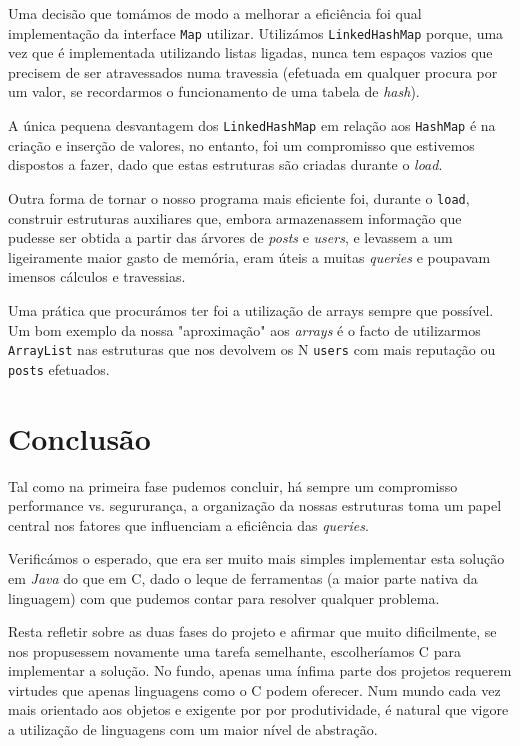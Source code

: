 \documentclass[10pt]{article}
\begin{document}
			Uma decisão que tomámos de modo a melhorar a eficiência
	foi qual implementação da interface \texttt{Map} utilizar.
	Utilizámos \texttt{LinkedHashMap} porque, uma vez que é 
	implementada utilizando listas ligadas, nunca tem espaços vazios 
	que precisem de ser atravessados numa travessia (efetuada 
	em qualquer procura por um valor, se recordarmos o funcionamento 
	de uma tabela de \textit{hash}). 
	
		A única pequena desvantagem dos
	\texttt{LinkedHashMap} em relação aos \texttt{HashMap} é na 
	criação e inserção de valores, no entanto, foi um compromisso que 
	estivemos dispostos a fazer, dado que estas estruturas são criadas 
	durante o \textit{load}.
	
		Outra forma de tornar o nosso programa mais eficiente foi, 
	durante o \texttt{load}, construir estruturas auxiliares que, 
	embora armazenassem informação que pudesse ser obtida a partir 
	das árvores de \textit{posts} e \textit{users}, e levassem a um 
	ligeiramente maior gasto de memória, eram úteis a muitas 
	\textit{queries} e poupavam imensos cálculos e travessias.
	
	
		Uma prática que procurámos ter foi a utilização de arrays 
	sempre que possível. Um bom exemplo da nossa "aproximação" aos 
	\textit{arrays} é o facto de utilizarmos \texttt{ArrayList} nas 
	estruturas que nos devolvem os N \texttt{users} com mais reputação 
	ou \texttt{posts} efetuados.
	


\section{Conclusão}
	Tal como na primeira fase pudemos concluir, há sempre um 
compromisso performance vs. segururança, a organização da nossas 
estruturas toma um papel central nos fatores que influenciam a 
eficiência das \textit{queries}.
	
		
	Verificámos o esperado, que era ser muito mais simples implementar 
esta solução em \textit{Java} do que em C, dado o leque de ferramentas 
(a maior parte nativa da linguagem) com que pudemos contar para 
resolver qualquer problema.

	Resta refletir sobre as duas fases do projeto e afirmar que 
muito dificilmente, se nos propusessem novamente uma tarefa 
semelhante, escolheríamos C para implementar a solução. No fundo, 
apenas uma ínfima parte dos projetos requerem virtudes que apenas 
linguagens como o C podem oferecer. Num mundo cada vez mais 
orientado aos objetos e exigente por por produtividade, é natural 
que vigore a utilização de linguagens com um maior nível de abstração.
\end{document}
